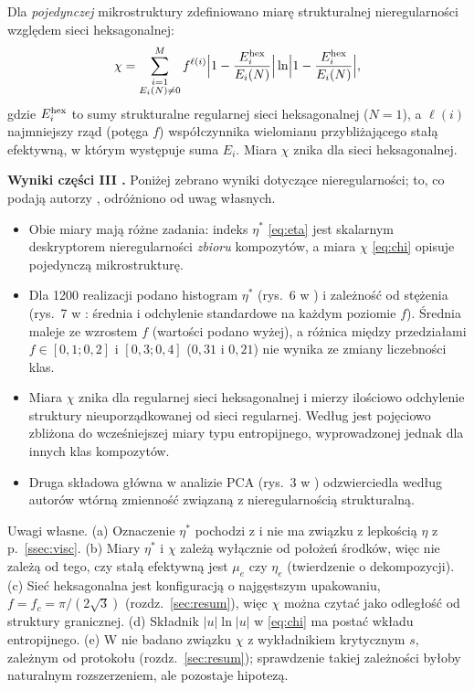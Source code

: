 \documentclass[12pt,a4paper,twoside,openright]{report}
\theoremstyle{definition}
\theoremstyle{remark}
\begin{document}
Dla \emph{pojedynczej} mikrostruktury zdefiniowano miarę strukturalnej nieregularności względem sieci heksagonalnej:
\begin{equation}\label{eq:chi}
\chi=\sum_{\substack{i=1\\E_i(N)\ne0}}^{M}f^{\ell(i)}\Bigl|1-\frac{E_i^{\rm hex}}{E_i(N)}\Bigr|\ln\Bigl|1-\frac{E_i^{\rm hex}}{E_i(N)}\Bigr|,
\end{equation}
gdzie $E_i^{\rm hex}$ to sumy strukturalne regularnej sieci heksagonalnej ($N=1$), a $\ell(i)$ najmniejszy rząd (potęga $f$) współczynnika wielomianu przybliżającego stałą efektywną, w którym występuje suma $E_i$. Miara $\chi$ znika dla sieci heksagonalnej.

\textbf{Wyniki części III \cite{mityushev2025computationalpart3}.} Poniżej zebrano wyniki dotyczące nieregularności; to, co podają autorzy \cite{mityushev2025computationalpart3}, odróżniono od uwag własnych.
\begin{itemize}[nosep]
\item Obie miary mają różne zadania: indeks $\eta^*$ \eqref{eq:eta} jest skalarnym deskryptorem nieregularności \emph{zbioru} kompozytów, a miara $\chi$ \eqref{eq:chi} opisuje pojedynczą mikrostrukturę.
\item Dla 1200 realizacji podano histogram $\eta^*$ (rys.~6 w \cite{mityushev2025computationalpart3}) i zależność od stężenia (rys.~7 w \cite{mityushev2025computationalpart3}: średnia i odchylenie standardowe na każdym poziomie $f$). Średnia maleje ze wzrostem $f$ (wartości podano wyżej), a różnica między przedziałami $f\in[0{,}1;0{,}2]$ i $[0{,}3;0{,}4]$ ($0{,}31$ i $0{,}21$) nie wynika ze zmiany liczebności klas.
\item Miara $\chi$ znika dla regularnej sieci heksagonalnej i mierzy ilościowo odchylenie struktury nieuporządkowanej od sieci regularnej. Według \cite{mityushev2025computationalpart3} jest pojęciowo zbliżona do wcześniejszej miary typu entropijnego, wyprowadzonej jednak dla innych klas kompozytów.
\item Druga składowa główna w analizie PCA (rys.~3 w \cite{mityushev2025computationalpart3}) odzwierciedla według autorów wtórną zmienność związaną z nieregularnością strukturalną.
\end{itemize}
Uwagi własne. (a) Oznaczenie $\eta^*$ pochodzi z \cite{mityushev2025computationalpart3} i nie ma związku z lepkością $\eta$ z p.~\ref{ssec:visc}. (b) Miary $\eta^*$ i $\chi$ zależą wyłącznie od położeń środków, więc nie zależą od tego, czy stałą efektywną jest $\mu_e$ czy $\eta_e$ (twierdzenie o dekompozycji). (c) Sieć heksagonalna jest konfiguracją o najgęstszym upakowaniu, $f=f_c=\pi/(2\sqrt3)$ (rozdz.~\ref{sec:resum}), więc $\chi$ można czytać jako odległość od struktury granicznej. (d) Składnik $|u|\ln|u|$ w \eqref{eq:chi} ma postać wkładu entropijnego. (e) W \cite{czapla2025computational,mityushev2025computationalpart3} nie badano związku $\chi$ z wykładnikiem krytycznym $s$, zależnym od protokołu (rozdz.~\ref{sec:resum}); sprawdzenie takiej zależności byłoby naturalnym rozszerzeniem, ale pozostaje hipotezą.
\end{document}
